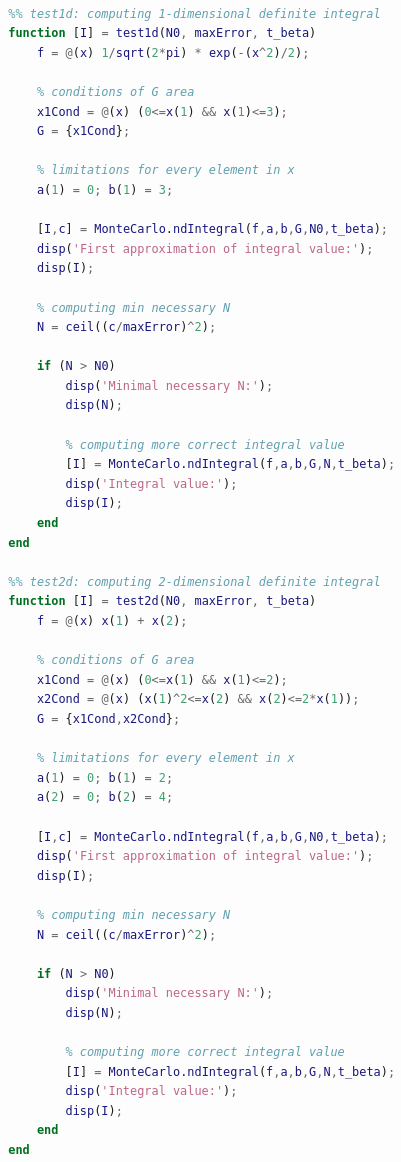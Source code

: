 \documentclass[a4paper,12pt]{article}
\begin{document}
\begin{lstlisting}[language=MATLAB]
        %% TESTS
        
        %% test1d: computing 1-dimensional definite integral
        function [I] = test1d(N0, maxError, t_beta)
            f = @(x) 1/sqrt(2*pi) * exp(-(x^2)/2);

            % conditions of G area
            x1Cond = @(x) (0<=x(1) && x(1)<=3);
            G = {x1Cond};
            
            % limitations for every element in x
            a(1) = 0; b(1) = 3;
            
            [I,c] = MonteCarlo.ndIntegral(f,a,b,G,N0,t_beta);
            disp('First approximation of integral value:');
            disp(I);
            
            % computing min necessary N
            N = ceil((c/maxError)^2);
            
            if (N > N0)
                disp('Minimal necessary N:');
                disp(N);

                % computing more correct integral value
                [I] = MonteCarlo.ndIntegral(f,a,b,G,N,t_beta);
                disp('Integral value:');
                disp(I);
            end
        end
        
        %% test2d: computing 2-dimensional definite integral
        function [I] = test2d(N0, maxError, t_beta)
            f = @(x) x(1) + x(2);
            
            % conditions of G area
            x1Cond = @(x) (0<=x(1) && x(1)<=2);
            x2Cond = @(x) (x(1)^2<=x(2) && x(2)<=2*x(1));
            G = {x1Cond,x2Cond};
            
            % limitations for every element in x
            a(1) = 0; b(1) = 2;
            a(2) = 0; b(2) = 4;
            
            [I,c] = MonteCarlo.ndIntegral(f,a,b,G,N0,t_beta);
            disp('First approximation of integral value:');
            disp(I);
            
            % computing min necessary N
            N = ceil((c/maxError)^2);
            
            if (N > N0)
                disp('Minimal necessary N:');
                disp(N);

                % computing more correct integral value
                [I] = MonteCarlo.ndIntegral(f,a,b,G,N,t_beta);
                disp('Integral value:');
                disp(I);
            end
        end
        

\end{lstlisting}
\end{document}

